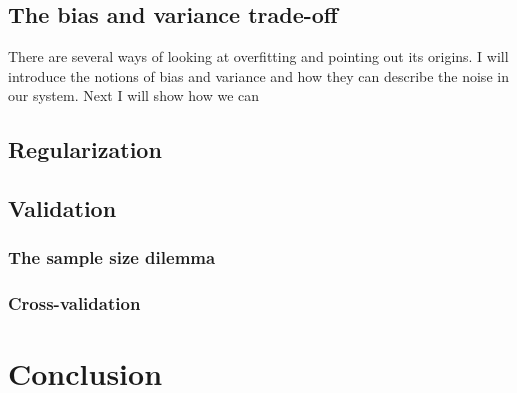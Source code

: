 \subsection{The bias and variance trade-off}
There are several ways of looking at overfitting and pointing out its origins. I will introduce the notions of bias and variance and how they can describe the noise in our system. Next I will show how we can 
\subsection{Regularization}

\subsection{Validation} 

\subsubsection{The sample size dilemma}

\subsubsection{Cross-validation}

\section{Conclusion}


